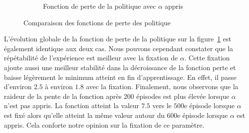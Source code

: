 \begin{figure}[H]
\begin{subfigure}{0.45\textwidth}
        \caption{Fonction de perte de la politique avec \(\alpha\) appris}
    \end{subfigure}
    \caption{Comparaison des fonctions de perte des politique}\label{fig:sac:policy_loss4}
\end{figure}

L'évolution globale de la fonction de perte de la politique sur la figure~\ref{fig:sac:policy_loss4} est également
identique aux deux cas. Nous pouvons cependant constater que la répétabilité de l'expérience est meilleur avec la fixation de \(\alpha\). Cette fixation ajoute aussi une meilleur stabilité dans la décroissance de la fonction perte et baisse légèrement le minimum atteint en fin d'apprentissage. En effet, il passe d'environ \( 2.5\) à environ \( 1.8\) avec la fixation. Finalement, nous observons que la raideur de la pente de la fonction après \(200\) épisodes est plus élevée lorsque \(\alpha\) n'est pas appris. La fonction atteint la valeur \(7.5\) vers le \(500\)e épisode lorsque \(\alpha\) est fixé alors qu'elle atteint la même valeur autour du \(600\)e épisode lorsque \(\alpha\) est appris. Cela conforte notre opinion sur la fixation de ce paramètre.

